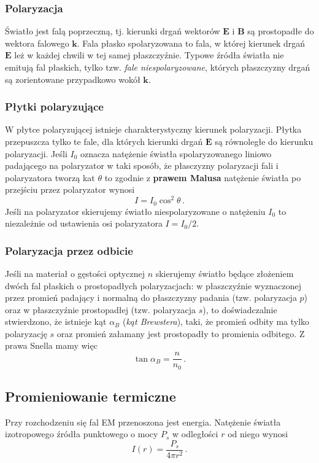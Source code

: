 \documentclass[../main.tex]{subfiles}
\begin{document}
\subsubsection{Polaryzacja}
Światło jest falą poprzeczną, tj. kierunki drgań wektorów \(\mathbf{E}\) i \(\mathbf{B}\) są
prostopadłe do wektora falowego \(\mathbf{k}\). Fala płasko spolaryzowana to fala, w której kierunek
drgań \(\mathbf{E}\) leż w każdej chwili w tej samej płaszczyźnie. Typowe źródła światła nie emitują
fal płaskich, tylko tzw. \textit{fale niespolaryzowane}, których płaszczyzny drgań są zorientowane
przypadkowo wokół \(\mathbf{k}\).
\subsubsection*{Płytki polaryzujące}
W płytce polaryzującej istnieje charakterystyczny kierunek polaryzacji. Płytka przepuszcza tylko te
fale, dla których kierunki drgań \(\mathbf{E}\) są równoległe do kierunku polaryzacji. Jeśli \(I_0\)
oznacza natężenie światła spolaryzowanego liniowo padającego na polaryzator w taki sposób, że
płasczyzny polaryzacji fali i polaryzatora tworzą kat \(\theta\) to zgodnie z \textbf{prawem Malusa}
natężenie światła po przejściu przez polaryzator wynosi
\begin{equation*}
    I=I_0\cos^2\theta\,.
\end{equation*}
Jeśli na polaryzator skierujemy światło niespolaryzowane o natężeniu \(I_0\) to niezależnie od
ustawienia osi polaryzatora \(I=I_0/2\).
\subsubsection*{Polaryzacja przez odbicie}
Jeśli na materiał o gęstości optycznej \(n\) skierujemy światło będące złożeniem dwóch fal płaskich
o prostopadłych polaryzacjach: w płaszczyźnie wyznaczonej przez promień padający i normalną do
płaszczyzny padania (tzw. polaryzacja \(p\)) oraz w płaszczyźnie prostopadłej (tzw. polaryzacja
\(s\)), to doświadczalnie stwierdzono, że istnieje kąt \(\alpha_B\) (\textit{kąt Brewstera}), taki,
że promień odbity ma tylko polaryzację \(s\) oraz promień załamany jest prostopadły to promienia
odbitego. Z prawa Snella mamy więc
\begin{equation*}
    \tan\alpha_B=\frac{n}{n_0}\,.
\end{equation*}

\subsection{Promieniowanie termiczne}
Przy rozchodzeniu się fal EM przenoszona jest energia. Natężenie światła izotropowego źródła
punktowego o mocy \(P_s\) w odległości \(r\) od niego wynosi
\begin{equation*}
    I(r)=\frac{P_s}{4\pi r^2}\,.
\end{equation*}
\end{document}
